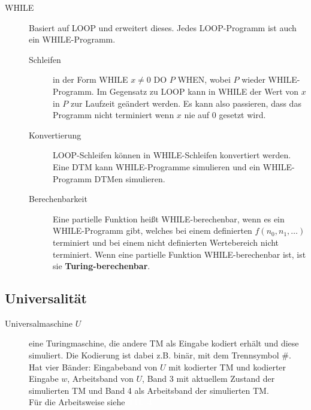 \documentclass[a4paper,10pt]{article}
\newcommand{\vl}[1]{\colorbox{vl}{\textcolor{white}{\small\textbf{#1}}}}
\newcommand{\f}[1]{\textbf{#1}}
\begin{document}
\begin{description}
        \item[WHILE] Basiert auf LOOP und erweitert dieses. Jedes LOOP-Programm ist auch ein WHILE-Programm.
            \begin{description}
                \item[Schleifen] in der Form WHILE $x \neq 0$ DO $P$ WHEN, wobei $P$ wieder WHILE-Programm. Im Gegensatz zu LOOP kann in WHILE der Wert von $x$ in $P$ zur Laufzeit geändert werden. Es kann also passieren, dass das Programm nicht terminiert wenn $x$ nie auf $0$ gesetzt wird.
                \item[Konvertierung] LOOP-Schleifen können in WHILE-Schleifen konvertiert werden. Eine DTM kann WHILE-Programme simulieren und ein WHILE-Programm DTMen simulieren.
                \item[Berechenbarkeit] Eine partielle Funktion heißt WHILE-berechenbar, wenn es ein WHILE-Programm gibt, welches bei einem definierten $f(n_0,n_1,…)$ terminiert und bei einem nicht definierten Wertebereich nicht terminiert. Wenn eine partielle Funktion WHILE-berechenbar ist, ist sie \f{Turing-berechenbar}.
            \end{description}

    \end{description}

    \subsection{Universalität}
    \begin{description}
        \item[Universalmaschine $U$] eine Turingmaschine, die andere TM als Eingabe kodiert erhält und diese simuliert. Die Kodierung ist dabei z.B. binär, mit dem Trennsymbol $\#$. Hat vier Bänder: Eingabeband von $U$ mit kodierter TM und kodierter Eingabe $w$, Arbeitsband von $U$, Band 3 mit aktuellem Zustand der simulierten TM und Band 4 als Arbeitsband der simulierten TM. \\ Für die Arbeitsweise siehe \vl{TIL 4}
    \end{description}

    \newpage
\end{document}
